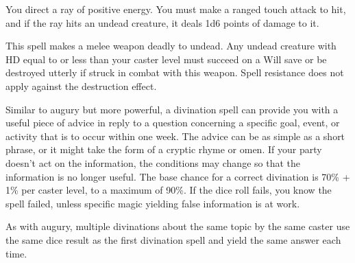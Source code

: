 \begin{multicols}{2}
\begin{small}
\noindent You direct a ray of positive energy. You must make a ranged touch attack to hit, and if the ray hits an undead creature, it deals 1d6 points of damage to it.

\noindent This spell makes a melee weapon deadly to undead. Any undead creature with HD equal to or less than your caster level must succeed on a Will save or be destroyed utterly if struck in combat with this weapon. Spell resistance does not apply against the destruction effect.

\noindent Similar to augury but more powerful, a divination spell can provide you with a useful piece of advice in reply to a question concerning a specific goal, event, or activity that is to occur within one week. The advice can be as simple as a short phrase, or it might take the form of a cryptic rhyme or omen. If your party doesn't act on the information, the conditions may change so that the information is no longer useful. The base chance for a correct divination is 70\% + 1\% per caster level, to a maximum of 90\%. If the dice roll fails, you know the spell failed, unless specific magic yielding false information is at work.

\smallskip\noindent As with augury, multiple divinations about the same topic by the same caster use the same dice result as the first divination spell and yield the same answer each time.



\end{small}
\end{multicols}
